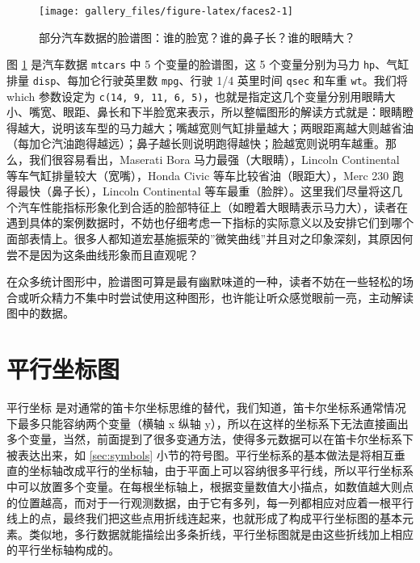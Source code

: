 \documentclass[
  b5paper,
  UTF8,twoside]{book}
\begin{document}
\begin{figure}

{\centering \texttt{[image: gallery\_files/figure-latex/faces2-1]} 

}

\caption[部分汽车数据的脸谱图]{部分汽车数据的脸谱图：谁的脸宽？谁的鼻子长？谁的眼睛大？}\label{fig:faces2}
\end{figure}

图 \ref{fig:faces2}
是汽车数据 \texttt{mtcars} 中 5 个变量的脸谱图，这 5 个变量分别为马力 \texttt{hp}、气缸排量 \texttt{disp}、每加仑行驶英里数 \texttt{mpg}、行驶 1/4 英里时间 \texttt{qsec} 和车重 \texttt{wt}。我们将 which 参数设定为 \texttt{c(14,\ 9,\ 11,\ 6,\ 5)}，也就是指定这几个变量分别用眼睛大小、嘴宽、眼距、鼻长和下半脸宽来表示，所以整幅图形的解读方式就是：眼睛瞪得越大，说明该车型的马力越大；嘴越宽则气缸排量越大；两眼距离越大则越省油（每加仑汽油跑得越远）；鼻子越长则说明跑得越快；脸越宽则说明车越重。那么，我们很容易看出，Maserati Bora 马力最强（大眼睛），Lincoln Continental 等车气缸排量较大（宽嘴），Honda Civic 等车比较省油（眼距大），Merc 230 跑得最快（鼻子长），Lincoln Continental 等车最重（脸胖）。这里我们尽量将这几个汽车性能指标形象化到合适的脸部特征上（如瞪着大眼睛表示马力大），读者在遇到具体的案例数据时，不妨也仔细考虑一下指标的实际意义以及安排它们到哪个面部表情上。很多人都知道宏基施振荣的''微笑曲线''并且对之印象深刻，其原因何尝不是因为这条曲线形象而且直观呢？

在众多统计图形中，脸谱图可算是最有幽默味道的一种，读者不妨在一些轻松的场合或听众精力不集中时尝试使用这种图形，也许能让听众感觉眼前一亮，主动解读图中的数据。

\section{平行坐标图}\label{sec:parcoords}

平行坐标 \citep{Inselberg07} 是对通常的笛卡尔坐标思维的替代，我们知道，笛卡尔坐标系通常情况下最多只能容纳两个变量（横轴 x 纵轴 y），所以在这样的坐标系下无法直接画出多个变量，当然，前面提到了很多变通方法，使得多元数据可以在笛卡尔坐标系下被表达出来，如 \ref{sec:symbols} 小节的符号图。平行坐标系的基本做法是将相互垂直的坐标轴改成平行的坐标轴，由于平面上可以容纳很多平行线，所以平行坐标系中可以放置多个变量。在每根坐标轴上，根据变量数值大小描点，如数值越大则点的位置越高，而对于一行观测数据，由于它有多列，每一列都相应对应着一根平行线上的点，最终我们把这些点用折线连起来，也就形成了构成平行坐标图的基本元素。类似地，多行数据就能描绘出多条折线，平行坐标图就是由这些折线加上相应的平行坐标轴构成的。
\end{document}
